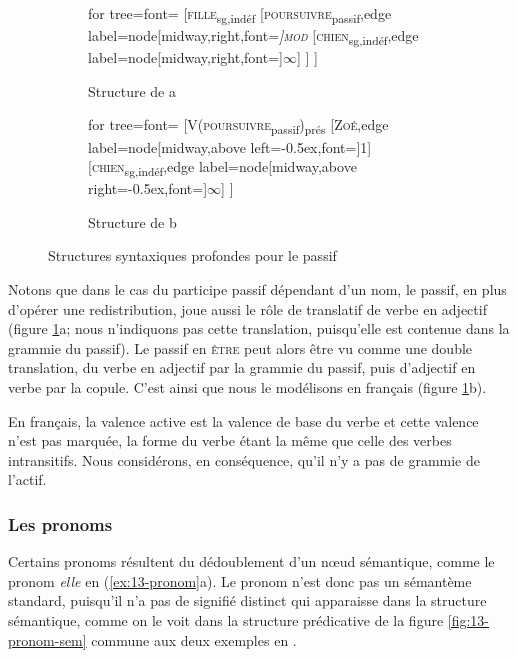 \begin{figure}
	\begin{subfigure}[b]{0.5\textwidth}
		\centering
		\begin{forest} for tree={font=\normalfont}
			[\textsc{fille}\textsubscript{sg,indéf}
				[\textsc{poursuivre}\textsubscript{passif},edge label={node[midway,right,font=\footnotesize\itshape]{\textsc{mod}}}
					[\textsc{chien}\textsubscript{sg,indéf},edge label={node[midway,right,font=\footnotesize]{$\infty$}}]
				]
			]
		\end{forest}
		\caption{Structure de a}
	\end{subfigure}%
	\hfill
	\begin{subfigure}[b]{0.5\textwidth}
		\centering
		\begin{forest} for tree={font=\normalfont}
			[V(\textsc{poursuivre}\textsubscript{passif})\textsubscript{prés}
				[\textsc{Zoé},edge label={node[midway,above left=-0.5ex,font=\footnotesize]{1}}]
				[\textsc{chien}\textsubscript{sg,indéf},edge label={node[midway,above right=-0.5ex,font=\footnotesize]{$\infty$}}]
			]
		\end{forest}
		\caption{Structure de b}
	\end{subfigure}
\caption{Structures syntaxiques profondes pour le passif\label{fig:13-passif}}
\end{figure}

Notons que dans le cas du participe passif dépendant d’un nom, le passif, en plus d’opérer une redistribution, joue aussi le rôle de translatif de verbe en adjectif (figure \ref{fig:13-passif}a; nous n’indiquons pas cette translation, puisqu’elle est contenue dans la grammie du passif). Le passif en \textsc{être} peut alors être vu comme une double translation, du verbe en adjectif par la grammie du passif, puis d’adjectif en verbe par la copule. C’est ainsi que nous le modélisons en français (figure \ref{fig:13-passif}b).

En français, la valence active est la valence de base du verbe et cette valence n'est pas marquée, la forme du verbe étant la même que celle des verbes intransitifs.  Nous considérons, en conséquence, qu'il n'y a pas de grammie de l'actif.


\subsubsection{Les pronoms}
Certains pronoms résultent du dédoublement d’un nœud sémantique, comme le pronom \textit{elle} en (\ref{ex:13-pronom}a). Le pronom n’est donc pas un sémantème standard, puisqu’il n’a pas de signifié distinct qui apparaisse dans la structure sémantique, comme on le voit dans la structure prédicative de la figure \ref{fig:13-pronom-sem} commune aux deux exemples en .

